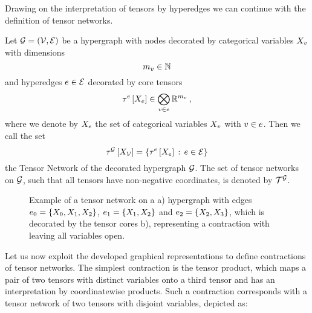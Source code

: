 Drawing on the interpretation of tensors by hyperedges we can continue with the definition of tensor networks.

\begin{definition}\label{def:tensorNetwork}
	Let $\mathcal{G}=(\mathcal{V},\mathcal{E})$ be a hypergraph with nodes decorated by categorical variables $X_{v}$ with dimensions
		\[ m_{v} \in \mathbb{N} \]
	and hyperedges $e\in\mathcal{E}$ decorated by core tensors
		\[ \tau^{e}\left[X_{e}\right] \in \bigotimes_{v\in e}\mathbb{R}^{m_{v}} \, , \]
	where we denote by $X_{e}$ the set of categorical variables $X_{v}$ with $v\in e$.
	Then we call the set
		\[ \tau^{\mathcal{G}}\left[X_{\mathcal{V}}\right] = \{\tau^{e}\left[X_{e}\right]  \,:\, e\in\mathcal{E}\} \]
	the Tensor Network of the decorated hypergraph $\mathcal{G}$.
	The set of tensor networks on $\mathcal{G}$, such that all tensors have non-negative coordinates, is denoted by $\mathcal{T}^{\mathcal{G}}$.
\end{definition}


\begin{figure}
	\begin{center}
		
	\end{center}
	\caption{
	Example of a tensor network on a
	a) hypergraph with edges $e_0=\{X_{0},X_{1},X_{2}\}$, $e_1=\{X_{1},X_{2}\}$ and $e_2=\{X_{2},X_{3}\}$,
	which is decorated by the tensor cores b), representing a contraction with leaving all variables open.
	}\label{fig:network}
\end{figure}






Let us now exploit the developed graphical representations to define contractions of tensor networks.
The simplest contraction is the tensor product, which maps a pair of two tensors with distinct variables onto a third tensor and has an interpretation by coordinatewise products.
Such a contraction corresponds with a tensor network of two tensors with disjoint variables, depicted as:
\begin{center}
	
\end{center}

